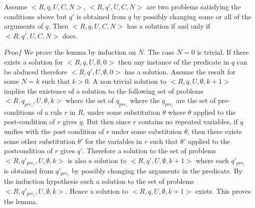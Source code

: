 \documentclass[sigconf]{acmart}
\begin{document}
\begin{lemma}
Assume $<R,q,U,C,N>$, $<R,q',U,C,N>$ are two problems satisfying the conditions above but $q'$ is obtained from $q$ by possibly changing some or all of the arguments of $q$. Then $<R,q,U,C,N>$ has a solution if and only if $<R,q',U,C,N>$ does.\\
\end{lemma}
$Proof$ We prove the lemma by induction on $N$.
The case $N = 0$ is trivial. If there exists a solution for $<R,q,U,\emptyset,0>$ then any instance of the predicate in $q$ can be abduced therefore $<R,q',U,\emptyset,0>$ has a solution. Assume the result for some $N = k$ such that $k>0$. A non trivial solution to $<R,q,U,\emptyset,k+1>$ implies the existence of a solution to the following set of problems $<R,q_{pre_{i}},U,\emptyset,k>$ where the set of $q_{pre_{i}}$ where the $q_{pre_{i}}$ are the set of pre-conditions of a rule $r$ in $R$, under some substitution $\theta$ where $\theta$ applied to the post-condition of $r$ gives $q$. But then since $r$ contains no repeated variables, if $q$ unifies with the post condition of $r$ under some substituion $\theta$, then there exists some other substitution $\theta'$ for the variables in $r$ such that $\theta'$ applied to the postcondition of $r$ gives $q'$. Therefore a solution to the set of problems $<R,q'_{pre_{i}},U,\emptyset,k>$ is also a solution to $<R,q',U,\emptyset,k+1>$ where each $q'_{pre_{i}}$ is obtained from $q'_{pre_{i}}$ by possibly changing the arguments in the predicate. By the induction hypothesis such a solution to the set of problems $<R,q'_{pre_{i}},U,\emptyset,k>$. Hence a solution to  $<R,q,U,\emptyset,k+1>$ exists. This proves the lemma.\\
\end{document}
